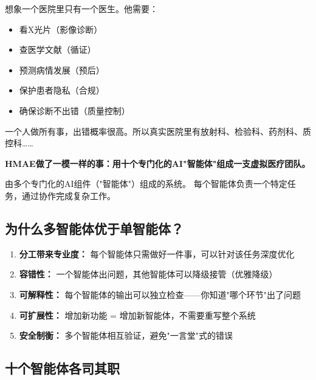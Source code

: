 \documentclass[11pt,a4paper]{ctexart}
\begin{document}
想象一个医院里只有一个医生。他需要：
\begin{itemize}[nosep]
\item 看X光片（影像诊断）
\item 查医学文献（循证）
\item 预测病情发展（预后）
\item 保护患者隐私（合规）
\item 确保诊断不出错（质量控制）
\end{itemize}

一个人做所有事，出错概率很高。所以真实医院里有放射科、检验科、药剂科、质控科……

\textbf{HMAE做了一模一样的事：用十个专门化的AI"智能体"组成一支虚拟医疗团队。}

\begin{defbox}
由多个专门化的AI组件（"智能体"）组成的系统。
每个智能体负责一个特定任务，通过协作完成复杂工作。
\end{defbox}

\subsection{为什么多智能体优于单智能体？}

\begin{enumerate}[nosep]
\item \textbf{分工带来专业度：} 每个智能体只需做好一件事，可以针对该任务深度优化
\item \textbf{容错性：} 一个智能体出问题，其他智能体可以降级接管（优雅降级）
\item \textbf{可解释性：} 每个智能体的输出可以独立检查——你知道"哪个环节"出了问题
\item \textbf{可扩展性：} 增加新功能 = 增加新智能体，不需要重写整个系统
\item \textbf{安全制衡：} 多个智能体相互验证，避免"一言堂"式的错误
\end{enumerate}

\subsection{十个智能体各司其职}
\end{document}

